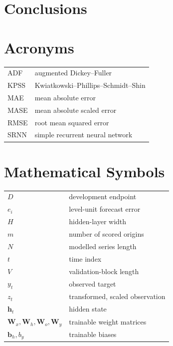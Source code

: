 \documentclass[conference,10pt]{IEEEtran}
\begin{document}
\section{Conclusions}


\appendices
\section{Acronyms}
\begin{tabular}{ll}
ADF & augmented Dickey--Fuller\\
KPSS & Kwiatkowski--Phillips--Schmidt--Shin\\
MAE & mean absolute error\\
MASE & mean absolute scaled error\\
RMSE & root mean squared error\\
SRNN & simple recurrent neural network
\end{tabular}

\section{Mathematical Symbols}
\begin{tabular}{ll}
$D$ & development endpoint\\
$e_i$ & level-unit forecast error\\
$H$ & hidden-layer width\\
$m$ & number of scored origins\\
$N$ & modelled series length\\
$t$ & time index\\
$V$ & validation-block length\\
$y_t$ & observed target\\
$z_t$ & transformed, scaled observation\\
$\mathbf h_t$ & hidden state\\
$\mathbf W_x,\mathbf W_h,\mathbf W_o,\mathbf W_y$ & trainable weight matrices\\
$\mathbf b_h,b_y$ & trainable biases
\end{tabular}



\end{document}
